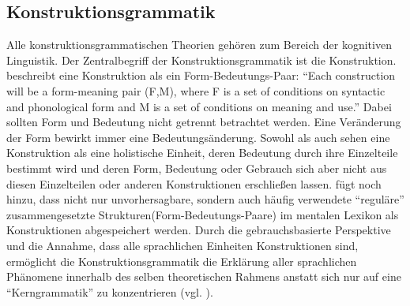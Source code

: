 


\subsection{Konstruktionsgrammatik}
Alle konstruktionsgrammatischen Theorien gehören zum Bereich der kognitiven Linguistik.
Der Zentralbegriff der Konstruktionsgrammatik ist die Konstruktion.
\cite{Lakoff87} beschreibt eine Konstruktion als ein Form-Bedeutungs-Paar:
``Each construction will be a form-meaning pair (F,M), where F is a set of conditions on syntactic and phonological form and M is a set of conditions on meaning and use.''
Dabei sollten Form und Bedeutung nicht getrennt betrachtet werden.
Eine Veränderung der Form bewirkt immer eine Bedeutungsänderung.
Sowohl \cite{Lakoff87} als auch \cite{Goldberg95} sehen eine Konstruktion als eine holistische Einheit, deren Bedeutung durch ihre Einzelteile bestimmt wird und deren Form, Bedeutung oder Gebrauch sich aber nicht aus diesen Einzelteilen oder anderen Konstruktionen erschließen lassen.
\cite{Goldberg06} fügt noch hinzu, dass nicht nur unvorhersagbare, sondern auch häufig verwendete ``reguläre'' zusammengesetzte Strukturen(Form-Bedeutungs-Paare) im mentalen Lexikon als Konstruktionen abgespeichert werden.
Durch die gebrauchsbasierte Perspektive und die Annahme, dass alle sprachlichen Einheiten Konstruktionen sind, ermöglicht die Konstruktionsgrammatik die Erklärung aller sprachlichen Phänomene innerhalb des selben theoretischen Rahmens anstatt sich nur auf eine ``Kerngrammatik'' zu konzentrieren (vgl. \cite{Tomasello06}).


